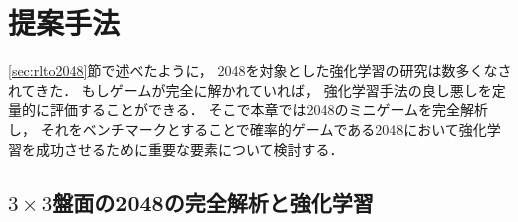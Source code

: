 \chapter{提案手法}
\label{chap:proposal}
\ref{sec:rlto2048}節で述べたように， 2048を対象とした強化学習の研究は数多くなされてきた．
もしゲームが完全に解かれていれば， 強化学習手法の良し悪しを定量的に評価することができる．
そこで本章では2048のミニゲームを完全解析し， それをベンチマークとすることで確率的ゲームである2048において強化学習を成功させるために重要な要素について検討する．



\section{$3\times3$盤面の2048の完全解析と強化学習}
